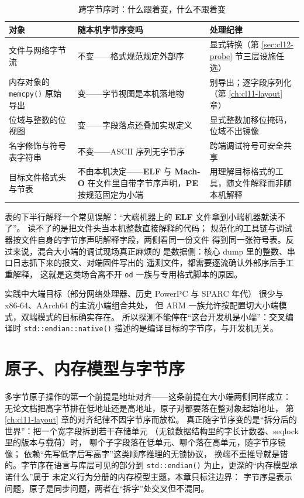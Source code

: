 \documentclass[12pt,a4paper,fontset=fandol]{ctexbook}
\newcommand{\Fn}[1]{\texttt{#1()}}
\newcommand{\Tool}[1]{\texttt{#1}}
\newcommand{\Mx}[1]{\textsf{#1}}
\newcommand{\Elf}{\textbf{\textsf{ELF}}}
\newcommand{\PeFmt}{\textbf{\textsf{PE}}}
\newcommand{\Macho}{\textbf{\textsf{Mach-O}}}
\newcommand{\xSixtyFour}{\textsf{x86-64}}
\newcommand{\ArmSixtyFour}{\textsf{AArch64}}
\begin{document}
\begin{table}[htbp]
\centering
\caption{跨字节序时：什么跟着变，什么不跟着变}\label{tab:cl12-endian-scope}
\begin{tabularx}{0.80\textwidth}{>{\raggedright\arraybackslash}p{} X X}
\toprule
对象 & 随本机字节序变吗 & 处理纪律 \\
\midrule
文件与网络字节流 & 不变——格式规范规定外部序 & 显式转换（第 \ref{sec:cl12-probe} 节三层设施任选） \\
内存对象的 \Fn{memcpy} 原始导出 & 变——字节视图是本机落地物 & 别导出；逐字段序列化（第 \ref{ch:cl11-layout} 章） \\
位域与整数的位视图 & 变——字段落点还叠加实现定义 & 显式整数加移位掩码，位域不出镜像 \\
名字修饰与符号表字符串 & 不变——ASCII 序列无字节序 & 跨端调试符号可安全共享 \\
目标文件格式头与节表 & 不由本机决定——\Elf{} 与 \Macho{} 在文件里自带字节序声明，\PeFmt{} 按规范固定为小端 & 用理解目标格式的工具，随文件解释而非随本机解释 \\
\bottomrule
\end{tabularx}
\end{table}

表的下半行解释一个常见误解：“大端机器上的 \Elf{} 文件拿到小端机器就读不了”。
读不了的是把文件头当本机整数直接解释的代码；
规范化的工具链与调试器按文件自身的字节序声明解释字段，两侧看同一份文件
得到同一张符号表。反过来说，混合大小端的调试现场真正麻烦的
是数据侧：核心 dump 里的整数、串口日志抓下来的报文、对端固件写出的
遥测文件，都需要逐流确认外部序后手工重解释，
这就是这类场合离不开 \Tool{od} 一族与专用格式脚本的原因。

\begin{note}[title={字节序常与架构耦合出现}]
实践中大端目标（部分网络处理器、历史 \Mx{PowerPC} 与 \Mx{SPARC} 年代）
很少与 \xSixtyFour{}、\ArmSixtyFour{} 的主流小端组合共处，
但 ARM 一族允许按配置切大小端模式，双端模式的目标确实存在。
所以探测不能停在“这台开发机是小端”：交叉编译时
\Fn{std::endian::native} 描述的是编译目标的字节序，与开发机无关。
\end{note}

\section{原子、内存模型与字节序}\label{sec:cl12-atomics}

多字节原子操作的第一个前提是地址对齐——这条前提在大小端两侧同样成立：
无论文档把高字节排在低地址还是高地址，原子对都要落在整对象起始地址，
第 \ref{ch:cl11-layout} 章的对齐纪律不因字节序而放松。
真正随字节序变的是“拆分后的世界”：把一个宽字段拆到若干存储单元
（无锁数据结构里的字长计数器、seqlock 里的版本与载荷）时，
哪个子字段落在低单元、哪个落在高单元，随字节序镜像；
依赖“先写低字后写高字”这类顺序推理的无锁协议，
换端不重推导就是错的。字节序在语言与库层可见的部分到
\Fn{std::endian} 为止，更深的“内存模型承诺什么”属于
未定义行为分册的内存模型主题，本章只标注边界：
字节序是表示问题，原子是同步问题，两者在“拆字”处交叉但不混同。
\end{document}
